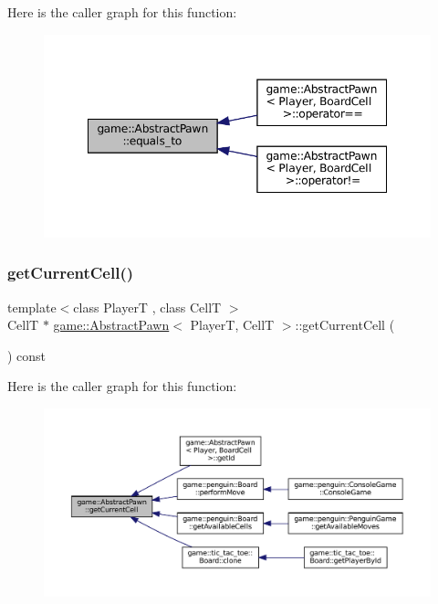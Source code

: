 Here is the caller graph for this function\+:
\nopagebreak
\begin{figure}[H]
\begin{center}
\leavevmode
\includegraphics[width=348pt]{classgame_1_1_abstract_pawn_aa1911c1f88d6b345a4a004cded7e6904_icgraph}
\end{center}
\end{figure}
\mbox{\label{classgame_1_1_abstract_pawn_ae9ad3bf0ee738571d0dd5992feae6bb7}} 
\subsubsection{\texorpdfstring{get\+Current\+Cell()}{getCurrentCell()}}
{\footnotesize\ttfamily template$<$class PlayerT , class CellT $>$ \\
CellT $\ast$ \hyperlink{classgame_1_1_abstract_pawn}{game\+::\+Abstract\+Pawn}$<$ PlayerT, CellT $>$\+::get\+Current\+Cell (\begin{DoxyParamCaption}{ }\end{DoxyParamCaption}) const}

Here is the caller graph for this function\+:
\nopagebreak
\begin{figure}[H]
\begin{center}
\leavevmode
\includegraphics[width=350pt]{classgame_1_1_abstract_pawn_ae9ad3bf0ee738571d0dd5992feae6bb7_icgraph}
\end{center}
\end{figure}
\mbox{\label{classgame_1_1_abstract_pawn_a49354506912d0e1bf5272627aa2bc86e}} 
